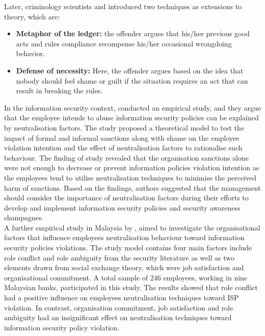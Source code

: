 Later, criminology scientists \citet{Rogers1974} and \citet{Minor1981} introduced two techniques as extensions to \citet{Sykes1957} theory, which are:
\begin{itemize}
	\item \textbf{Metaphor of the ledger:} the offender argues that his/her previous good acts and rules compliance recompense his/her occasional wrongdoing behavior\cite{Rogers1974}.
	\item \textbf{Defense of necessity:} Here, the offender argues based on the idea that nobody should feel shame or guilt if the situation requires an act that can result in breaking the rules\cite{Minor1981}.
\end{itemize}

In the information security context, \citet{Siponen2010}conducted an empirical study, and they argue that the employee intends to abuse information security policies can be explained by neutralisation factors. The study proposed a theoretical model to test the impact of formal and informal sanctions along with shame on the employee violation intention and the effect of neutralisation factors to rationalise such behaviour. The finding of \cite{Siponen2010} study revealed that the organisation sanctions alone were not enough to decrease or prevent information policies violation intention as the employees tend to utilise neutralisation techniques to minimise the perceived harm of sanctions. Based on the findings, authors suggested that the management should consider the importance of neutralisation factors during their efforts to develop and implement information security policies and security awareness champagnes.\\

A further empirical study in Malaysia by \citet{Teh2015}, aimed to investigate the organisational factors that influence employees neutralisation behaviour toward information security policies violations. The study model contains four main factors include role conflict and role ambiguity from the security literature as well as two elements drawn from social exchange theory, which were job satisfaction and organisational commitment. A total sample of 246 employees, working in nine Malaysian banks, participated in this study. The results showed that role conflict had a positive influence on employees neutralisation techniques toward ISP violation. In contrast, organisation commitment, job satisfaction and role ambiguity had an insignificant effect on neutralisation techniques toward information security policy violation.\\

